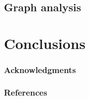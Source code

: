 \documentclass{article} %
\begin{document}
\subsection{Graph analysis}



\section{Conclusions}



\subsubsection*{Acknowledgments}



\subsubsection*{References}
\end{document}
